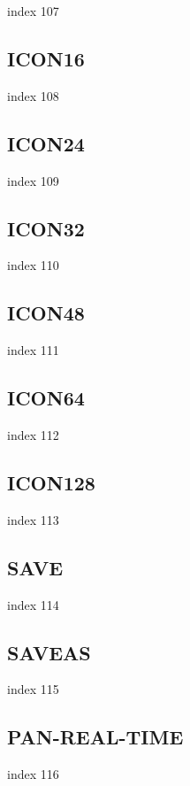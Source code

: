 \documentclass[a4paper]{report}
\begin{document}
index 107

\subsection{ICON16}

index 108

\subsection{ICON24}

index 109

\subsection{ICON32}

index 110

\subsection{ICON48}

index 111

\subsection{ICON64}

index 112

\subsection{ICON128}

index 113

\subsection{SAVE}

index 114

\subsection{SAVEAS}

index 115

\subsection{PAN-REAL-TIME}

index 116
\end{document}
